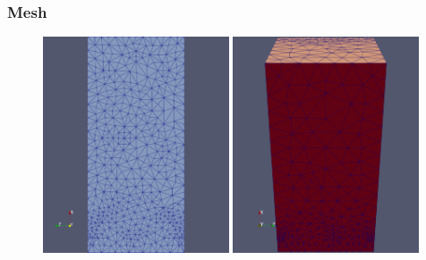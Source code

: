 \documentclass[
  pdf,
  10pt,
  xcolor={svgnames},
]{beamer}
\begin{document}
\begin{frame}
  \frametitle{Mesh}
  \begin{figure}
    \centering
    \includegraphics[width=0.49\textwidth]{./resources/mesh_bot}
    \includegraphics[width=0.49\textwidth]{./resources/mesh_top}
  \end{figure}
\end{frame}
\end{document}
